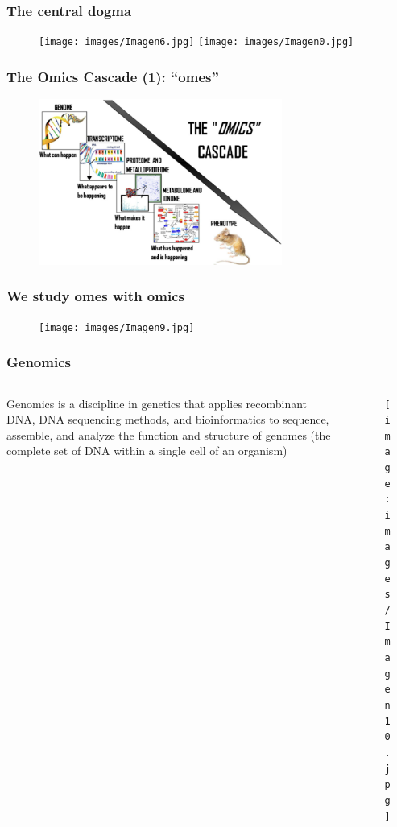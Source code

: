 \documentclass{beamer}
\begin{document}
  
  \begin{frame}
  	\frametitle{The central dogma}
  	\begin{figure}[ht]
  		\centering
  		\texttt{[image: images/Imagen6.jpg]}
  		\texttt{[image: images/Imagen0.jpg]}
  	\end{figure} 
  \end{frame}
  
  
  \begin{frame}
  	\frametitle{The Omics Cascade (1): ``omes''}
  	\begin{figure}[ht]
  		\centering
  		\includegraphics[width=80mm]{images/omicsCascade.png}
  	\end{figure} 
  \end{frame}
  
  
  \begin{frame}
  	\frametitle{We study omes with omics}
  	\begin{figure}[ht]
  		\centering
  		\texttt{[image: images/Imagen9.jpg]}
  	\end{figure} 
  \end{frame}
  
  
\begin{frame}
  	\frametitle{Genomics}
  	\begin{columns}%
  		\begin{column}[t]{0.45\textwidth}%
  			Genomics is a discipline in genetics that applies recombinant DNA, DNA sequencing methods, and bioinformatics to sequence, assemble, and analyze the function and structure of genomes (the complete set of DNA within a single cell of an organism)
  		\end{column}
  		  		
  		\begin{column}[t]{0.45\textwidth}%
  			\begin{figure}[ht]
  				\centering
  				\texttt{[image: images/Imagen10.jpg]}
  			\end{figure} 
  		\end{column}
  	\end{columns}
  \end{frame}
\end{document}
